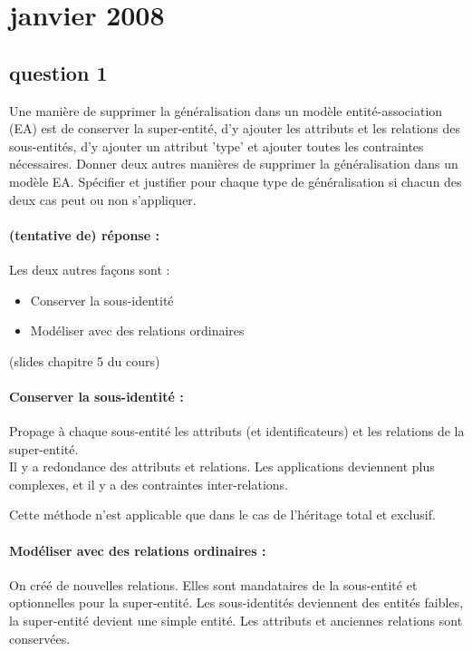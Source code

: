 \section{janvier 2008}

\subsection{question 1}
	Une manière de supprimer la généralisation dans un modèle  entité-association (EA) est de 	conserver la super-entité, d'y ajouter les attributs et les relations des sous-entités, d'y ajouter un attribut 'type' et ajouter toutes les contraintes nécessaires.	Donner deux autres manières de supprimer la généralisation dans un modèle EA. Spécifier et justifier pour chaque type de généralisation si chacun des deux cas peut ou non s'appliquer.


\paragraph{(tentative de) réponse :}
Les deux autres façons sont : 
\begin{itemize}
	\item Conserver la sous-identité 
	\item Modéliser avec des relations ordinaires
\end{itemize}
(slides chapitre 5 du cours)
\paragraph{Conserver la sous-identité :} Propage à chaque sous-entité les attributs 
(et identificateurs) et les relations de la super-entité.\\
Il y a redondance des attributs et relations. Les applications deviennent plus 
complexes, et il y a des contraintes inter-relations.

Cette méthode n'est applicable que dans le cas de l'héritage total et exclusif.

\paragraph{Modéliser avec des relations ordinaires :}
On créé de nouvelles relations. Elles sont mandataires de la sous-entité et 
optionnelles pour la super-entité.
Les sous-identités deviennent des entités faibles, la super-entité devient 
une simple entité.
Les attributs et anciennes relations sont conservées.\\

